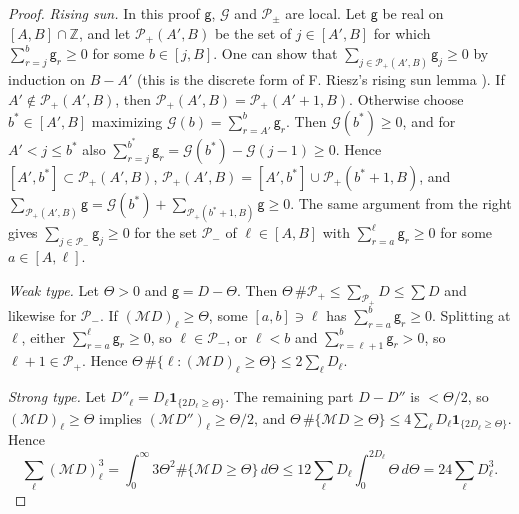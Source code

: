 \documentclass[11pt,a4paper]{article}
\makeatletter
\numberwithin{equation}{section}
\DeclareRobustCommand{\CGcite}[2][]{\if\relax\detokenize{#1}\relax\cite{#2}\else\cite[#1]{#2}\fi}
\newcommand{\CG@getbib}[1]{\@ifundefined{CGBib@#1}{#1}{\csname CGBib@#1\endcsname}}
\DeclareRobustCommand{\CGcite}[2][]{\pdftooltip{\if\relax\detokenize{#1}\relax\cite{#2}\else\cite[#1]{#2}\fi}{\CG@getbib{#2}}}
\theoremstyle{definition}
\theoremstyle{remark}
\newcommand{\M}{\mathcal M}
\newcommand{\Ind}{\mathbf 1}
\newcommand{\Z}{\mathbb Z}
\makeatother
\begin{document}
\begin{proof}
\emph{Rising sun.} In this proof $\mathsf g$, $\mathcal G$ and $\mathcal P_\pm$ are local. Let $\mathsf g$ be real on $[A,B]\cap\Z$, and let $\mathcal P_+(A',B)$ be the set of $j\in[A',B]$ for which $\sum_{r=j}^b\mathsf g_r\ge0$ for some $b\in[j,B]$. One can show that $\sum_{j\in \mathcal P_+(A',B)}\mathsf g_j\ge0$ by induction on $B-A'$ (this is the discrete form of F. Riesz's rising sun lemma \CGcite{Riesz1932}). If $A'\notin \mathcal P_+(A',B)$, then $\mathcal P_+(A',B)=\mathcal P_+(A'+1,B)$. Otherwise choose $b^*\in[A',B]$ maximizing $\mathcal G(b)=\sum_{r=A'}^b\mathsf g_r$. Then $\mathcal G(b^*)\ge0$, and for $A'<j\le b^*$ also $\sum_{r=j}^{b^*}\mathsf g_r=\mathcal G(b^*)-\mathcal G(j-1)\ge0$. Hence $[A',b^*]\subset \mathcal P_+(A',B)$, $\mathcal P_+(A',B)=[A',b^*]\cup \mathcal P_+(b^*+1,B)$, and $\sum_{\mathcal P_+(A',B)}\mathsf g=\mathcal G(b^*)+\sum_{\mathcal P_+(b^*+1,B)}\mathsf g\ge0$. The same argument from the right gives $\sum_{j\in\mathcal P_-}\mathsf g_j\ge0$ for the set $\mathcal P_-$ of $\ell\in[A,B]$ with $\sum_{r=a}^\ell \mathsf g_r\ge0$ for some $a\in[A,\ell]$.

\emph{Weak type.} Let $\Theta>0$ and $\mathsf g=D-\Theta$. Then $\Theta\,\#\mathcal P_+\le\sum_{\mathcal P_+}D\le\sum D$ and likewise for $\mathcal P_-$. If $(\M D)_\ell\ge\Theta$, some $[a,b]\ni\ell$ has $\sum_{r=a}^b\mathsf g_r\ge0$. Splitting at $\ell$, either $\sum_{r=a}^{\ell}\mathsf g_r\ge0$, so $\ell\in\mathcal P_-$, or $\ell<b$ and $\sum_{r=\ell+1}^b\mathsf g_r>0$, so $\ell+1\in\mathcal P_+$. Hence $\Theta\,\#\{\ell:(\M D)_\ell\ge\Theta\}\le2\sum_\ell D_\ell$.

\emph{Strong type.} Let $D''_\ell=D_\ell\Ind_{\{2D_\ell\ge\Theta\}}$. The remaining part $D-D''$ is $<\Theta/2$, so $(\M D)_\ell\ge\Theta$ implies $(\M D'')_\ell\ge\Theta/2$, and $\Theta\,\#\{\M D\ge\Theta\}\le4\sum_\ell D_\ell\Ind_{\{2D_\ell\ge\Theta\}}$. Hence
\begin{equation}
\sum_\ell(\M D)_\ell^3=\int_0^\infty3\Theta^2\#\{\M D\ge\Theta\}\,d\Theta\le12\sum_\ell D_\ell\int_0^{2D_\ell}\Theta\,d\Theta=24\sum_\ell D_\ell^3 .
\label{eq:disp_20}
\end{equation}
\end{proof}
\end{document}
